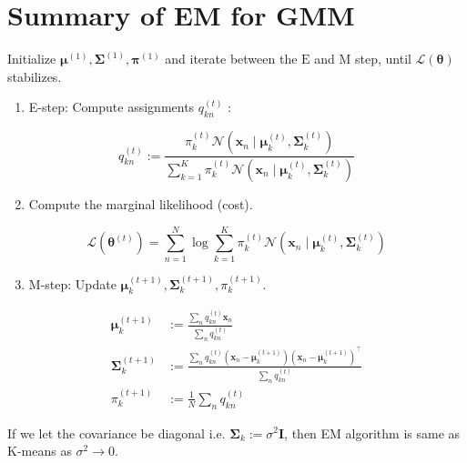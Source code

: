 \section*{Summary of EM for GMM}
Initialize $\boldsymbol{\mu}^{(1)}, \boldsymbol{\Sigma}^{(1)}, \boldsymbol{\pi}^{(1)}$ and iterate between the $\mathrm{E}$ and $\mathrm{M}$ step, until $\mathcal{L}(\boldsymbol{\theta})$ stabilizes.

\begin{enumerate}
  \item E-step: Compute assignments $q_{k n}^{(t)}$ :
\end{enumerate}

$$
q_{k n}^{(t)}:=\frac{\pi_{k}^{(t)} \mathcal{N}\left(\mathbf{x}_{n} \mid \boldsymbol{\mu}_{k}^{(t)}, \boldsymbol{\Sigma}_{k}^{(t)}\right)}{\sum_{k=1}^{K} \pi_{k}^{(t)} \mathcal{N}\left(\mathbf{x}_{n} \mid \boldsymbol{\mu}_{k}^{(t)}, \boldsymbol{\Sigma}_{k}^{(t)}\right)}
$$

\begin{enumerate}
  \setcounter{enumi}{1}
  \item Compute the marginal likelihood (cost).
\end{enumerate}

$$
\mathcal{L}\left(\boldsymbol{\theta}^{(t)}\right)=\sum_{n=1}^{N} \log \sum_{k=1}^{K} \pi_{k}^{(t)} \mathcal{N}\left(\mathbf{x}_{n} \mid \boldsymbol{\mu}_{k}^{(t)}, \boldsymbol{\Sigma}_{k}^{(t)}\right)
$$

\begin{enumerate}
  \setcounter{enumi}{2}
  \item M-step: Update $\boldsymbol{\mu}_{k}^{(t+1)}, \boldsymbol{\Sigma}_{k}^{(t+1)}, \pi_{k}^{(t+1)}$.
\end{enumerate}

$$
\begin{aligned}
\boldsymbol{\mu}_{k}^{(t+1)} & :=\frac{\sum_{n} q_{k n}^{(t)} \mathbf{x}_{n}}{\sum_{n} q_{k n}^{(t)}} \\
\boldsymbol{\Sigma}_{k}^{(t+1)} & :=\frac{\sum_{n} q_{k n}^{(t)}\left(\mathbf{x}_{n}-\boldsymbol{\mu}_{k}^{(t+1)}\right)\left(\mathbf{x}_{n}-\boldsymbol{\mu}_{k}^{(t+1)}\right)^{\top}}{\sum_{n} q_{k n}^{(t)}} \\
\pi_{k}^{(t+1)} & :=\frac{1}{N} \sum_{n} q_{k n}^{(t)}
\end{aligned}
$$

If we let the covariance be diagonal i.e. $\boldsymbol{\Sigma}_{k}:=\sigma^{2} \mathbf{I}$, then EM algorithm is same as K-means as $\sigma^{2} \rightarrow 0$.

